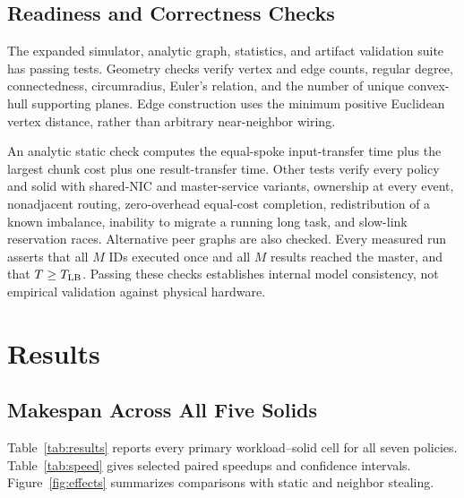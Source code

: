 \documentclass[10pt,journal,twocolumn]{IEEEtran}
\begin{document}
\subsection{Readiness and Correctness Checks}
The expanded simulator, analytic graph, statistics, and artifact validation suite has  passing tests. Geometry checks verify vertex and edge counts, regular degree, connectedness, circumradius, Euler's relation, and the number of unique convex-hull supporting planes. Edge construction uses the minimum positive Euclidean vertex distance, rather than arbitrary near-neighbor wiring.

An analytic static check computes the equal-spoke input-transfer time plus the largest chunk cost plus one result-transfer time. Other tests verify every policy and solid with shared-NIC and master-service variants, ownership at every event, nonadjacent routing, zero-overhead equal-cost completion, redistribution of a known imbalance, inability to migrate a running long task, and slow-link reservation races. Alternative peer graphs are also checked. Every measured run asserts that all $M$ IDs executed once and all $M$ results reached the master, and that $T\geq T_{\rm LB}$. Passing these checks establishes internal model consistency, not empirical validation against physical hardware.

\section{Results}
\subsection{Makespan Across All Five Solids}
Table~\ref{tab:results} reports every primary workload--solid cell for all seven policies. Table~\ref{tab:speed} gives selected paired speedups and confidence intervals. Figure~\ref{fig:effects} summarizes comparisons with static and neighbor stealing.

\begin{table}[!t]
\caption{Mean last-result makespan (ms), thirty paired seeds per cell, 2400 tasks. Solids have different worker counts; policy comparisons within a row have identical hardware and task instances.}
\label{tab:results}\centering\scriptsize

\end{table}

\begin{table}[!t]
\caption{Neighbor-push speedup over static: mean paired ratio and exploratory 95\% bootstrap interval. Total task count and total computation are identical across solids; worker count differs.}
\label{tab:speed}\centering

\end{table}
\end{document}
